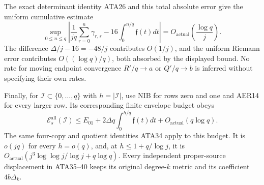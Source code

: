 The exact determinant identity ATA26 and this total absolute error
give the uniform cumulative estimate
\[
 \sup_{0\le n\le q}
 \left|\frac1{jq}\sum_{r=0}^n\gamma_{r,s}
               -16\int_0^{n/q}\mathfrak f(t)dt\right|
       =O_{\mathrm{actual}}\left(\frac{\log q}{j}\right).
                                                               \tag{AER21}
\]
The difference $\Delta/j-16=-48/j$ contributes $O(1/j)$,
and the uniform Riemann error contributes $O((\log q)/q)$,
both absorbed by the displayed bound.  No rate for moving
endpoint convergence $R'/q\to a$ or $Q'/q\to b$ is inferred
without specifying their own rates.

Finally, for $\mathscr I\subset\{0,\ldots,q\}$ with
$h=|\mathscr I|$, use NIB for rows zero and one and AER14 for
every larger row.  Its corresponding finite envelope budget obeys
\[
 \mathcal E_s^{\mathrm{all}}(\mathscr I)
 \le E_{01}+2\Delta q\int_0^{h/q}\mathfrak f(t)dt
                  +O_{\mathrm{actual}}(q\log q).        \tag{AER22}
\]
The same four-copy and quotient identities ATA34 apply to this
budget.  It is $o(jq)$ for every $h=o(q)$, and, at
$h\le1+q/\log j$, it is
$O_{\mathrm{actual}}(j^3\log\log j/\log j+q\log q)$.
Every independent proper-source displacement in ATA35--40 keeps
its original degree-$k$ metric and its coefficient $4b\Delta_k$.
\endgroup
